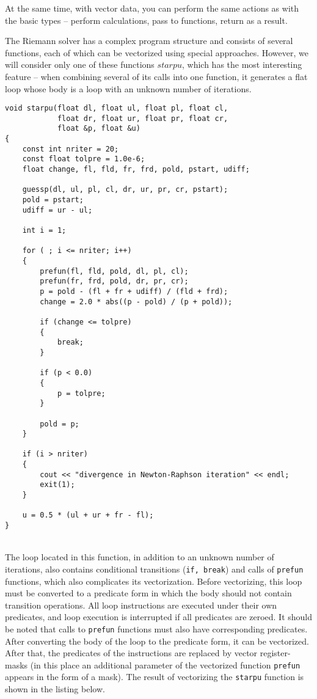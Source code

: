 \documentclass[
11pt,%
tightenlines,%
twoside,%
onecolumn,%
nofloats,%
nobibnotes,%
nofootinbib,%
superscriptaddress,%
noshowpacs,%
centertags]%
{revtex4}
\begin{document}
At the same time, with vector data, you can perform the same actions as with the basic types -- perform calculations, pass to functions, return as a result.

The Riemann solver has a complex program structure and consists of several functions, each of which can be vectorized using special approaches.
However, we will consider only one of these functions $starpu$, which has the most interesting feature -- when combining several of its calls into one function, it generates a flat loop whose body is a loop with an unknown number of iterations.

\begin{lstlisting}[caption={Original version of \texttt{starpu}.},label={lst:prac_riemann_starpu_orig}]
void starpu(float dl, float ul, float pl, float cl,
            float dr, float ur, float pr, float cr,
            float &p, float &u)
{
    const int nriter = 20;
    const float tolpre = 1.0e-6;
    float change, fl, fld, fr, frd, pold, pstart, udiff;

    guessp(dl, ul, pl, cl, dr, ur, pr, cr, pstart);
    pold = pstart;
    udiff = ur - ul;

    int i = 1;

    for ( ; i <= nriter; i++)
    {
        prefun(fl, fld, pold, dl, pl, cl);
        prefun(fr, frd, pold, dr, pr, cr);
        p = pold - (fl + fr + udiff) / (fld + frd);
        change = 2.0 * abs((p - pold) / (p + pold));

        if (change <= tolpre)
        {
            break;
        }

        if (p < 0.0)
        {
            p = tolpre;
        }

        pold = p;
    }

    if (i > nriter)
    {
        cout << "divergence in Newton-Raphson iteration" << endl;
        exit(1);
    }

    u = 0.5 * (ul + ur + fr - fl);
}
\end{lstlisting}

\ \\

The loop located in this function, in addition to an unknown number of iterations, also contains conditional transitions (\texttt{if, break}) and calls of \texttt{prefun} functions, which also complicates its vectorization.
Before vectorizing, this loop must be converted to a predicate form in which the body should not contain transition operations.
All loop instructions are executed under their own predicates, and loop execution is interrupted if all predicates are zeroed.
It should be noted that calls to \texttt{prefun} functions must also have corresponding predicates.
After converting the body of the loop to the predicate form, it can be vectorized. After that, the predicates of the instructions are replaced by vector register-masks (in this place an additional parameter of the vectorized function \texttt{prefun} appears in the form of a mask).
The result of vectorizing the \texttt{starpu} function is shown in the listing below.
\end{document}
